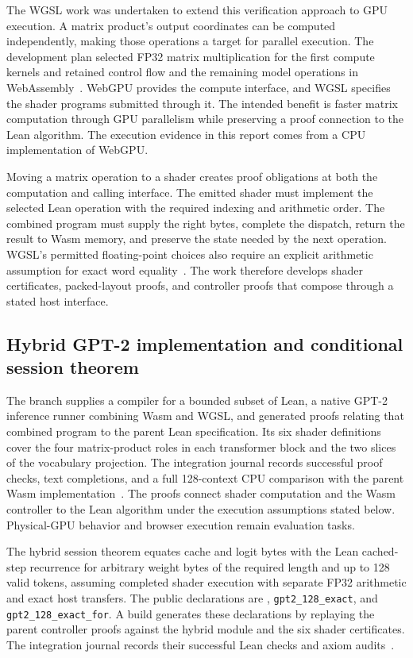 \documentclass[11pt]{article}
\newcommand{\code}[1]{\texttt{#1}}
\newcommand{\longcode}[1]{\texttt{\seqsplit{#1}}}
\begin{document}
The WGSL work was undertaken to extend this verification approach to GPU execution.  A matrix product's output coordinates can be computed independently, making those operations a target for parallel execution.  The development plan selected FP32 matrix multiplication for the first compute kernels and retained control flow and the remaining model operations in WebAssembly~\cite{plan}.  WebGPU provides the compute interface, and WGSL specifies the shader programs submitted through it.  The intended benefit is faster matrix computation through GPU parallelism while preserving a proof connection to the Lean algorithm.  The execution evidence in this report comes from a CPU implementation of WebGPU.

Moving a matrix operation to a shader creates proof obligations at both the computation and calling interface.  The emitted shader must implement the selected Lean operation with the required indexing and arithmetic order.  The combined program must supply the right bytes, complete the dispatch, return the result to Wasm memory, and preserve the state needed by the next operation.  WGSL's permitted floating-point choices also require an explicit arithmetic assumption for exact word equality~\cite{wgsl}.  The work therefore develops shader certificates, packed-layout proofs, and controller proofs that compose through a stated host interface.

\subsection{Hybrid GPT-2 implementation and conditional session theorem}

The branch supplies a compiler for a bounded subset of Lean, a native GPT-2 inference runner combining Wasm and WGSL, and generated proofs relating that combined program to the parent Lean specification.  Its six shader definitions cover the four matrix-product roles in each transformer block and the two slices of the vocabulary projection.  The integration journal records successful proof checks, text completions, and a full 128-context CPU comparison with the parent Wasm implementation~\cite{packedguide,journal}.  The proofs connect shader computation and the Wasm controller to the Lean algorithm under the execution assumptions stated below.  Physical-GPU behavior and browser execution remain evaluation tasks.

The hybrid session theorem equates cache and logit bytes with the Lean cached-step recurrence for arbitrary weight bytes of the required length and up to 128 valid tokens, assuming completed shader execution with separate FP32 arithmetic and exact host transfers.  The public declarations are \longcode{Project.Gpt2Hybrid.Spec.cachedStep\_exact}, \code{gpt2\_128\_exact}, and \code{gpt2\_128\_exact\_for}.  A build generates these declarations by replaying the parent controller proofs against the hybrid module and the six shader certificates.  The integration journal records their successful Lean checks and axiom audits~\cite{composition,journal}.
\end{document}
